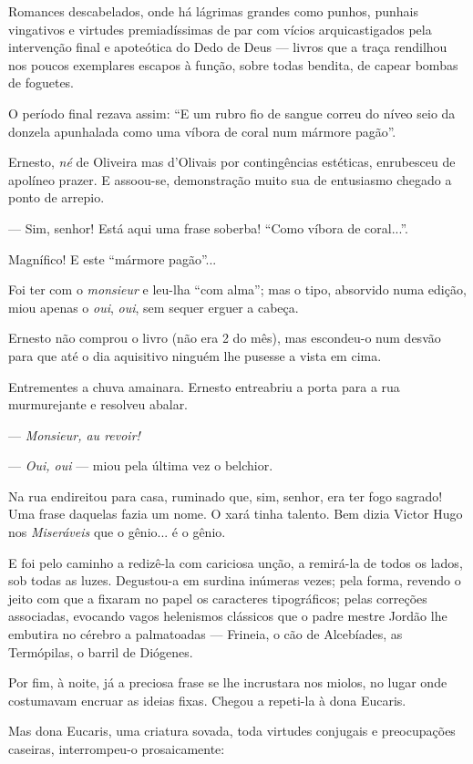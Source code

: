 Romances descabelados, onde há lágrimas grandes como punhos, punhais
vingativos e virtudes premiadíssimas de par com vícios arquicastigados
pela intervenção final e apoteótica do Dedo de Deus --- livros que a
traça rendilhou nos poucos exemplares escapos à função, sobre todas
bendita, de capear bombas de foguetes.

O período final rezava assim: ``E um rubro fio de sangue correu do níveo
seio da donzela apunhalada como uma víbora de coral num mármore pagão''.

Ernesto, \emph{né} de Oliveira mas d'Olivais por contingências
estéticas, enrubesceu de apolíneo prazer. E assoou-se, demonstração
muito sua de entusiasmo chegado a ponto de arrepio.

--- Sim, senhor! Está aqui uma frase soberba! ``Como víbora de
coral...''.

Magnífico! E este ``mármore pagão''...

Foi ter com o \emph{monsieur} e leu-lha ``com alma''; mas o tipo,
absorvido numa edição, miou apenas o \emph{oui}, \emph{oui}, sem sequer
erguer a cabeça.

Ernesto não comprou o livro (não era 2 do mês), mas escondeu-o num
desvão para que até o dia aquisitivo ninguém lhe pusesse a vista em
cima.

Entrementes a chuva amainara. Ernesto entreabriu a porta para a rua
murmurejante e resolveu abalar.

--- \emph{Monsieur, au revoir!}

--- \emph{Oui, oui} --- miou pela última vez o belchior.

Na rua endireitou para casa, ruminado que, sim, senhor, era ter fogo
sagrado! Uma frase daquelas fazia um nome. O xará tinha talento. Bem
dizia Victor Hugo nos \emph{Miseráveis} que o gênio... é o gênio.

E foi pelo caminho a redizê-la com cariciosa unção, a remirá-la de todos
os lados, sob todas as luzes. Degustou-a em surdina inúmeras vezes; pela
forma, revendo o jeito com que a fixaram no papel os caracteres
tipográficos; pelas correções associadas, evocando vagos helenismos
clássicos que o padre mestre Jordão lhe embutira no cérebro a
palmatoadas --- Frineia, o cão de Alcebíades, as Termópilas, o barril de
Diógenes.

Por fim, à noite, já a preciosa frase se lhe incrustara nos miolos, no
lugar onde costumavam encruar as ideias fixas. Chegou a repeti-la à dona
Eucaris.

Mas dona Eucaris, uma criatura sovada, toda virtudes conjugais e
preocupações caseiras, interrompeu-o prosaicamente:

